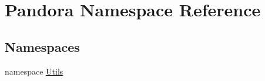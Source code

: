 \hypertarget{namespacePandora}{
\section{Pandora Namespace Reference}
\label{namespacePandora}
}
\subsection*{Namespaces}
\begin{DoxyCompactItemize}
\item 
namespace \hyperlink{namespacePandora_1_1Utils}{Utils}
\end{DoxyCompactItemize}
